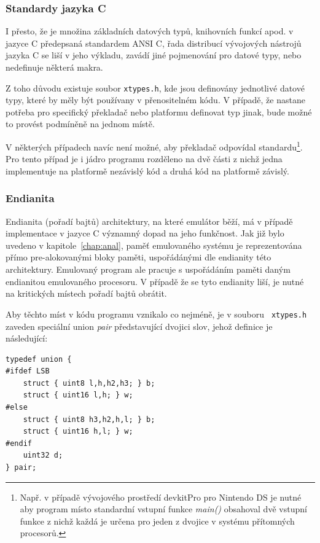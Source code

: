
\subsubsection{Standardy jazyka C}

I přesto, že je množina základních datových typů, knihovních funkcí apod. v
jazyce C předepsaná standardem ANSI C, řada distribucí vývojových nástrojů
jazyka C se liší v jeho výkladu, zavádí jiné pojmenování pro datové typy,
nebo nedefinuje některá makra.

Z toho důvodu existuje soubor {\tt xtypes.h}, kde jsou definovány jednotlivé
datové typy, které by měly být používany v přenositelném kódu. V případě, že
nastane potřeba pro specifický překladač nebo platformu definovat typ jinak,
bude možné to provést podmíněně na jednom místě.

V některých případech navíc není možné, aby překladač odpovídal
standardu\footnote{Např. v případě vývojového prostředí devkitPro pro Nintendo
DS je nutné aby program místo standardní vstupní funkce {\em main()} obsahoval
dvě vstupní funkce z nichž každá je určena pro jeden z dvojice v systému
přítomných procesorů.}. Pro tento případ je i jádro programu rozděleno na dvě
části z nichž jedna implementuje na platformě nezávislý kód a druhá kód na
platformě závislý.


\subsubsection{Endianita}

Endianita (pořadí bajtů) architektury, na které emulátor běží, má v případě
implementace v jazyce C významný dopad na jeho funkčnost. Jak již bylo uvedeno
v kapitole~\ref{chap:anal}, paměť emulovaného systému je reprezentována přímo
pre-alokovanými bloky paměti, uspořádánými dle endianity této architektury.
Emulovaný program ale pracuje s uspořádáním paměti daným endianitou emulovaného
procesoru. V případě že se tyto endianity liší, je nutné na kritických místech
pořadí bajtů obrátit.

Aby těchto míst v kódu programu vznikalo co nejméně, je v souboru {\tt
xtypes.h} zaveden speciální union {\em pair} představující dvojici slov,
jehož definice je následující:

\begin{verbatim}
typedef union {
#ifdef LSB
    struct { uint8 l,h,h2,h3; } b;
    struct { uint16 l,h; } w;
#else
    struct { uint8 h3,h2,h,l; } b;
    struct { uint16 h,l; } w;
#endif
    uint32 d;
} pair;
\end{verbatim}

